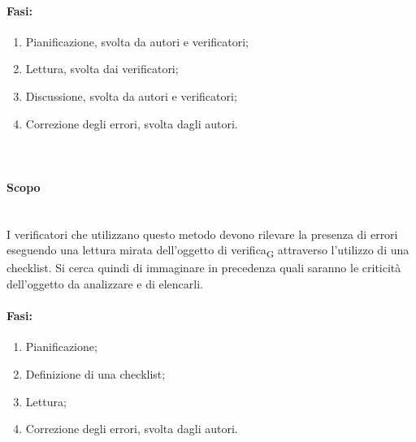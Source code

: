 \paragraph {Fasi:}\:
\begin{enumerate}
	\item Pianificazione, svolta da autori e verificatori;
	\item Lettura, svolta dai verificatori;
	\item Discussione, svolta da autori e verificatori;
	\item Correzione degli errori, svolta dagli autori.
\end{enumerate}
\paragraph {}\mbox{}\\
\paragraph {Scopo}\mbox{}\\
I verificatori che utilizzano questo metodo devono rilevare la presenza di errori eseguendo una lettura mirata dell’oggetto di verifica\textsubscript{G} attraverso l'utilizzo di una checklist. Si cerca quindi di immaginare in precedenza quali saranno le criticità dell'oggetto da analizzare e di elencarli.
\paragraph {Fasi:}\:
\begin{enumerate}
	\item Pianificazione;
	\item Definizione di una checklist;
	\item Lettura;
	\item Correzione degli errori, svolta dagli autori.
\end{enumerate}

